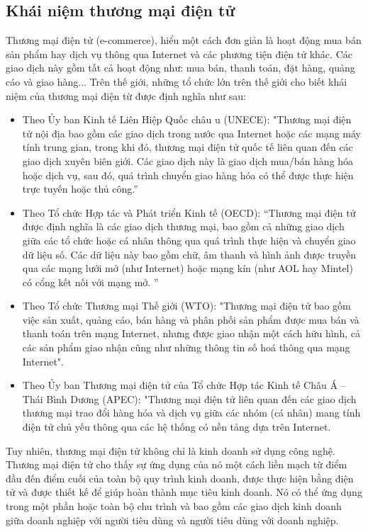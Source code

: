 \documentclass[12pt]{article}
\begin{document}
\subsection{Khái niệm thương mại điện tử}
Thương mại điện tử (e-commerce), hiểu một cách đơn giản là hoạt động mua bán sản phẩm hay dịch vụ thông qua Internet và các phương tiện điện tử khác. Các giao dịch này gồm tất cả hoạt động như: mua bán, thanh toán, đặt hàng, quảng cáo và giao hàng... Trên thế giới, những tổ chức lớn trên thế giới cho biết khái niệm của thương mại điện từ được định nghĩa như sau:
\begin{itemize}
    \item Theo Ủy ban Kinh tế Liên Hiệp Quốc châu  u (UNECE): "Thương mại điện tử nội địa bao gồm các giao dịch trong nước qua Internet hoặc các mạng máy tính trung gian, trong khi đó, thương mại điện tử quốc tế liên quan đến các giao dịch xuyên biên giới. Các giao dịch này là giao dịch mua/bán hàng hóa hoặc dịch vụ, sau đó, quá trình chuyển giao hàng hóa có thể được thực hiện trực tuyến hoặc thủ công.”
    \item Theo Tổ chức Hợp tác và Phát triển Kinh tế (OECD): “Thương mại điện tử được định nghĩa là các giao dịch thương mại, bao gồm cả những giao dịch giữa các tổ chức hoặc cá nhân thông qua quá trình thực hiện và chuyển giao dữ liệu số. Các dữ liệu này bao gồm chữ, âm thanh và hình ảnh được truyền qua các mạng lưới mở (như Internet) hoặc mạng kín (như AOL hay Mintel) có cổng kết nối với mạng mở. ”
    \item Theo Tổ chức Thương mại Thế giới (WTO): "Thương mại điện tử bao gồm việc sản xuất, quảng cáo, bán hàng và phân phối sản phẩm được mua bán và thanh toán trên mạng Internet, nhưng được giao nhận một cách hữu hình, cả các sản phẩm giao nhận cũng như những thông tin số hoá thông qua mạng Internet".
    \item Theo Ủy ban Thương mại điện tử của Tổ chức Hợp tác Kinh tế Châu Á – Thái Bình Dương (APEC): "Thương mại điện tử liên quan đến các giao dịch thương mại trao đổi hàng hóa và dịch vụ giữa các nhóm (cá nhân) mang tính điện tử chủ yếu thông qua các hệ thống có nền tảng dựa trên Internet.
\end{itemize}

Tuy nhiên, thương mại điện tử không chỉ là kinh doanh sử dụng công nghệ. Thương mại điện tử cho thấy sự ứng dụng của nó một cách liền mạch từ điểm đầu đến điểm cuối của toàn bộ quy trình kinh doanh, được thực hiện bằng điện tử và được thiết kế để giúp hoàn thành mục tiêu kinh doanh. Nó có thể ứng dụng trong một phần hoặc toàn bộ chu trình và bao gồm các giao dịch kinh doanh giữa doanh nghiệp với người tiêu dùng và người tiêu dùng với doanh nghiệp.
\end{document}
